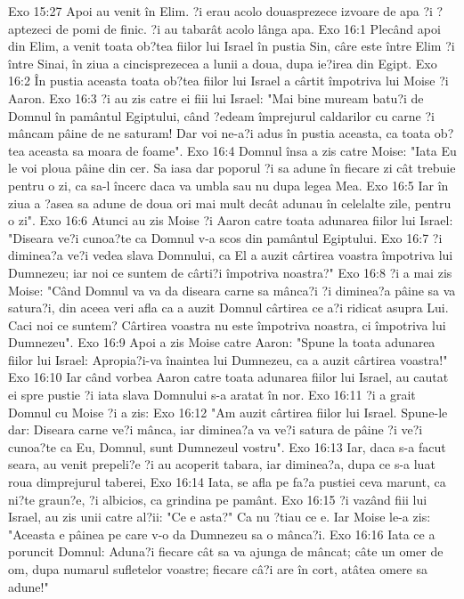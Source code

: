 Exo 15:27  Apoi au venit în Elim. ?i erau acolo douasprezece izvoare de apa ?i ?aptezeci de pomi de finic. ?i au tabarât acolo lânga apa.
Exo 16:1  Plecând apoi din Elim, a venit toata ob?tea fiilor lui Israel în pustia Sin, câre este între Elim ?i între Sinai, în ziua a cincisprezecea a lunii a doua, dupa ie?irea din Egipt.
Exo 16:2  În pustia aceasta toata ob?tea fiilor lui Israel a cârtit împotriva lui Moise ?i Aaron.
Exo 16:3  ?i au zis catre ei fiii lui Israel: "Mai bine muream batu?i de Domnul în pamântul Egiptului, când ?edeam împrejurul caldarilor cu carne ?i mâncam pâine de ne saturam! Dar voi ne-a?i adus în pustia aceasta, ca toata ob?tea aceasta sa moara de foame".
Exo 16:4  Domnul însa a zis catre Moise: "Iata Eu le voi ploua pâine din cer. Sa iasa dar poporul ?i sa adune în fiecare zi cât trebuie pentru o zi, ca sa-l încerc daca va umbla sau nu dupa legea Mea.
Exo 16:5  Iar în ziua a ?asea sa adune de doua ori mai mult decât adunau în celelalte zile, pentru o zi".
Exo 16:6  Atunci au zis Moise ?i Aaron catre toata adunarea fiilor lui Israel: "Diseara ve?i cunoa?te ca Domnul v-a scos din pamântul Egiptului.
Exo 16:7  ?i diminea?a ve?i vedea slava Domnului, ca El a auzit cârtirea voastra împotriva lui Dumnezeu; iar noi ce suntem de cârti?i împotriva noastra?"
Exo 16:8  ?i a mai zis Moise: "Când Domnul va va da diseara carne sa mânca?i ?i diminea?a pâine sa va satura?i, din aceea veri afla ca a auzit Domnul cârtirea ce a?i ridicat asupra Lui. Caci noi ce suntem? Cârtirea voastra nu este împotriva noastra, ci împotriva lui Dumnezeu".
Exo 16:9  Apoi a zis Moise catre Aaron: "Spune la toata adunarea fiilor lui Israel: Apropia?i-va înaintea lui Dumnezeu, ca a auzit cârtirea voastra!"
Exo 16:10  Iar când vorbea Aaron catre toata adunarea fiilor lui Israel, au cautat ei spre pustie ?i iata slava Domnului s-a aratat în nor.
Exo 16:11  ?i a grait Domnul cu Moise ?i a zis:
Exo 16:12  "Am auzit cârtirea fiilor lui Israel. Spune-le dar: Diseara carne ve?i mânca, iar diminea?a va ve?i satura de pâine ?i ve?i cunoa?te ca Eu, Domnul, sunt Dumnezeul vostru".
Exo 16:13  Iar, daca s-a facut seara, au venit prepeli?e ?i au acoperit tabara, iar diminea?a, dupa ce s-a luat roua dimprejurul taberei,
Exo 16:14  Iata, se afla pe fa?a pustiei ceva marunt, ca ni?te graun?e, ?i albicios, ca grindina pe pamânt.
Exo 16:15  ?i vazând fiii lui Israel, au zis unii catre al?ii: "Ce e asta?" Ca nu ?tiau ce e. Iar Moise le-a zis: "Aceasta e pâinea pe care v-o da Dumnezeu sa o mânca?i.
Exo 16:16  Iata ce a poruncit Domnul: Aduna?i fiecare cât sa va ajunga de mâncat; câte un omer de om, dupa numarul sufletelor voastre; fiecare câ?i are în cort, atâtea omere sa adune!"
